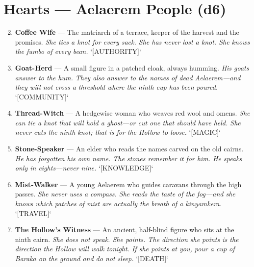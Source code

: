 \section*{Hearts --- Aelaerem People (d6)}
\label{subsec:aelaerem-people}
\begin{enumerate}
\setcounter{enumi}{1}
\item \textbf{Coffee Wife} --- The matriarch of a terrace, keeper of the harvest and the promises.
  \hfill \textit{She ties a knot for every sack. She has never lost a knot. She knows the \textit{fumbo} of every bean.} `[AUTHORITY]`
\item \textbf{Goat-Herd} --- A small figure in a patched cloak, always humming.
  \hfill \textit{His goats answer to the hum. They also answer to the names of dead Aelaerem---and they will not cross a threshold where the ninth cup has been poured.} `[COMMUNITY]`
\item \textbf{Thread-Witch} --- A hedgewise woman who weaves red wool and omens.
  \hfill \textit{She can tie a knot that will hold a ghost---or cut one that should have held. She never cuts the ninth knot; that is for the Hollow to loose.} `[MAGIC]`
\item \textbf{Stone-Speaker} --- An elder who reads the names carved on the old cairns.
  \hfill \textit{He has forgotten his own name. The stones remember it for him. He speaks only in eights---never nine.} `[KNOWLEDGE]`
\item \textbf{Mist-Walker} --- A young Aelaerem who guides caravans through the high passes.
  \hfill \textit{She never uses a compass. She reads the taste of the fog---and she knows which patches of mist are actually the breath of a \textit{kinyamkera}.} `[TRAVEL]`
\item \textbf{The Hollow's Witness} --- An ancient, half-blind figure who sits at the ninth cairn.
  \hfill \textit{She does not speak. She points. The direction she points is the direction the Hollow will walk tonight. If she points at you, pour a cup of \textit{Baraka} on the ground and do not sleep.} `[DEATH]`
\end{enumerate}

